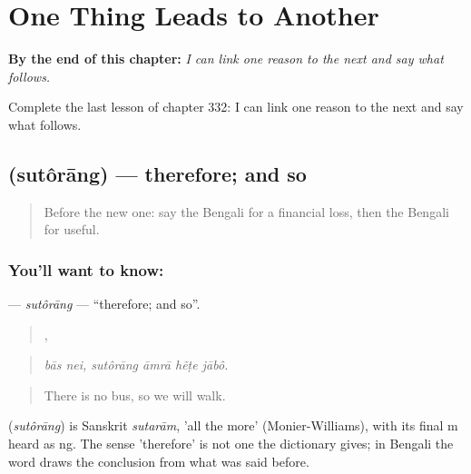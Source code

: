 
\chapter{One Thing Leads to Another}
\label{ch:bn-one-thing-leads-to-another}

\begin{chapteropening}
\textbf{By the end of this chapter:} \emph{I can link one reason to the next and say what follows.}

Complete the last lesson of chapter 332: I can link one reason to the next and say what follows.
\end{chapteropening}

\section[\texorpdfstring{\bn{সুতরাং} (sutôrāng)}{সুতরাং (sutôrāng)}]{ (sutôrāng) — therefore; and so}

\label{lesson:BN-C332-sutorang}



\begin{quote}
Before the new one: say the Bengali for a financial loss, then the Bengali for useful.
\end{quote}

\subsection*{You'll want to know: }
\textbf{} — \emph{sutôrāng} — \textquotedblleft{}therefore; and so\textquotedblright{}.

\begin{quote}
 ,    
\end{quote}

\begin{quote}
\emph{bās nei, sutôrāng āmrā hẽṭe jābô.}
\end{quote}

\begin{quote}
There is no bus, so we will walk.
\end{quote}

\begin{cousinweb}
\textbf{} (\emph{sutôrāng}) is Sanskrit \emph{sutarām}, 'all the more' (Monier-Williams), with its final m heard as ng. The sense 'therefore' is not one the dictionary gives; in Bengali the word draws the conclusion from what was said before.
\end{cousinweb}


